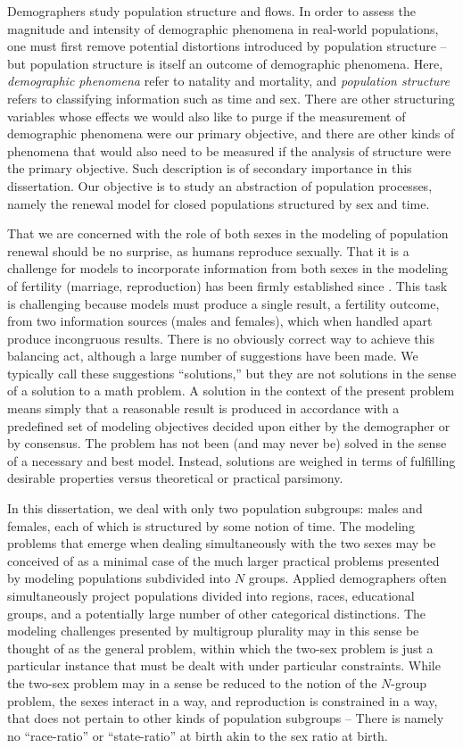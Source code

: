 Demographers study population structure and flows. In order
to assess the magnitude and intensity of demographic phenomena in real-world
populations, one must first remove potential distortions introduced by
population structure -- but population structure is itself an outcome
of demographic phenomena. Here, \textit{demographic phenomena} refer to natality
and mortality, and \textit{population structure} refers to classifying
information such as time and sex. There are other structuring variables whose effects we would also
like to purge if the measurement of demographic phenomena 
were our primary objective, and there are other kinds of phenomena that would
also need to be measured if the analysis of structure were the primary
objective. Such description is of secondary importance in this dissertation. Our
objective is to study an abstraction of population processes, namely the 
renewal model for closed populations structured by sex and time.

That we are concerned with the role of both sexes in the modeling of population
renewal should be no surprise, as humans reproduce sexually. That it is a
challenge for models to incorporate information from both sexes in the modeling
of fertility (marriage, reproduction) has been firmly established since
\citet{karmel1947relations}. This task is challenging because models must
produce a single result, a fertility outcome, from two information sources
(males and females), which when handled apart produce incongruous results. 
There is no obviously correct way to achieve this balancing act, although a
large number of suggestions have been made. We typically call these suggestions
``solutions,'' but they are not solutions in the sense of a solution to a math problem. A
solution in the context of the present problem means simply that a reasonable
result is produced in accordance with a predefined set of modeling objectives
decided upon either by the demographer or by consensus. The problem has not been
(and may never be) solved in the sense of a necessary and best model. Instead,
solutions are weighed in terms of fulfilling desirable properties versus theoretical 
or practical parsimony.

In this dissertation, we deal with only two population subgroups: males and
females, each of which is structured by some notion of time. The modeling
problems that emerge when dealing simultaneously with the two sexes may be
conceived of as a minimal case of the much larger practical problems 
presented by modeling populations subdivided into $N$
groups. Applied demographers often simultaneously project
populations divided into regions, races, educational groups, and a potentially
large number of other categorical distinctions. The modeling
challenges presented by multigroup plurality may in this sense be thought of as
the general problem, within which the two-sex problem is just a particular
instance that must be dealt with under particular constraints. While the two-sex
problem may in a sense be reduced to the notion of the $N$-group problem, the
sexes interact in a way, and reproduction is constrained in a way, that does 
not pertain to other kinds of population subgroups -- There is namely no
``race-ratio'' or ``state-ratio'' at birth akin to the sex ratio at birth.

